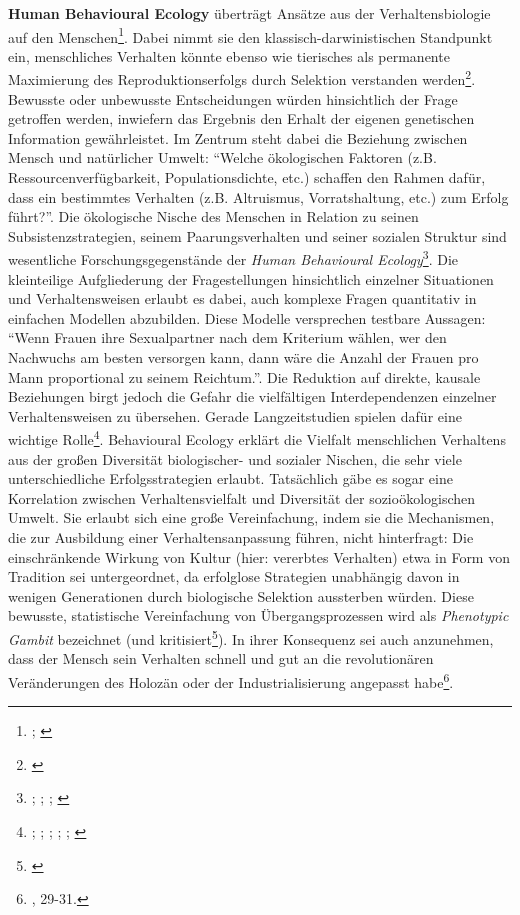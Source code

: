 \documentclass[openany,twoside,twocolumn]{book}
\let\rmarkdownfootnote\footnote%
\def\footnote{\protect\rmarkdownfootnote}
\begin{document}
\textbf{Human Behavioural Ecology} überträgt Ansätze aus der Verhaltensbiologie auf den Menschen\footnote{\textcite{smith_cultural_1992}; \textcite{winterhalder_analyzing_2000}}. Dabei nimmt sie den klassisch-darwinistischen Standpunkt ein, menschliches Verhalten könnte ebenso wie tierisches als permanente Maximierung des Reproduktionserfolgs durch Selektion verstanden werden\footnote{\textcite{creanza_cultural_2017}}. Bewusste oder unbewusste Entscheidungen würden hinsichtlich der Frage getroffen werden, inwiefern das Ergebnis den Erhalt der eigenen genetischen Information gewährleistet. Im Zentrum steht dabei die Beziehung zwischen Mensch und natürlicher Umwelt: ``Welche ökologischen Faktoren (z.B. Ressourcenverfügbarkeit, Populationsdichte, etc.) schaffen den Rahmen dafür, dass ein bestimmtes Verhalten (z.B. Altruismus, Vorratshaltung, etc.) zum Erfolg führt?''. Die ökologische Nische des Menschen in Relation zu seinen Subsistenzstrategien, seinem Paarungsverhalten und seiner sozialen Struktur sind wesentliche Forschungsgegenstände der \emph{Human Behavioural Ecology}\footnote{\textcite{henrich_search_2001}; \textcite{kaplan_theory_2000}; \textcite{voland_evolutionary_1998}; \textcite{winterhalder_risk-senstive_1999}}. Die kleinteilige Aufgliederung der Fragestellungen hinsichtlich einzelner Situationen und Verhaltensweisen erlaubt es dabei, auch komplexe Fragen quantitativ in einfachen Modellen abzubilden. Diese Modelle versprechen testbare Aussagen: ``Wenn Frauen ihre Sexualpartner nach dem Kriterium wählen, wer den Nachwuchs am besten versorgen kann, dann wäre die Anzahl der Frauen pro Mann proportional zu seinem Reichtum.''. Die Reduktion auf direkte, kausale Beziehungen birgt jedoch die Gefahr die vielfältigen Interdependenzen einzelner Verhaltensweisen zu übersehen. Gerade Langzeitstudien spielen dafür eine wichtige Rolle\footnote{\textcite{belovsky_optimal_1988}; \textcite{broughton_widening_1997}; \textcite{low_population_1993}; \textcite{stiner_paleolithic_1999}; \textcite{stiner_tortoise_2000}; \textcite{winterhalder_population_1988}}. Behavioural Ecology erklärt die Vielfalt menschlichen Verhaltens aus der großen Diversität biologischer- und sozialer Nischen, die sehr viele unterschiedliche Erfolgsstrategien erlaubt. Tatsächlich gäbe es sogar eine Korrelation zwischen Verhaltensvielfalt und Diversität der sozioökologischen Umwelt. Sie erlaubt sich eine große Vereinfachung, indem sie die Mechanismen, die zur Ausbildung einer Verhaltensanpassung führen, nicht hinterfragt: Die einschränkende Wirkung von Kultur (hier: vererbtes Verhalten) etwa in Form von Tradition sei untergeordnet, da erfolglose Strategien unabhängig davon in wenigen Generationen durch biologische Selektion aussterben würden. Diese bewusste, statistische Vereinfachung von Übergangsprozessen wird als \emph{Phenotypic Gambit} bezeichnet (und kritisiert\footnote{\textcite{rubin_phenotypic_2016}}). In ihrer Konsequenz sei auch anzunehmen, dass der Mensch sein Verhalten schnell und gut an die revolutionären Veränderungen des Holozän oder der Industrialisierung angepasst habe\footnote{\textcite{SmithThreestylesevolutionary2000}, 29-31.}.
\end{document}
